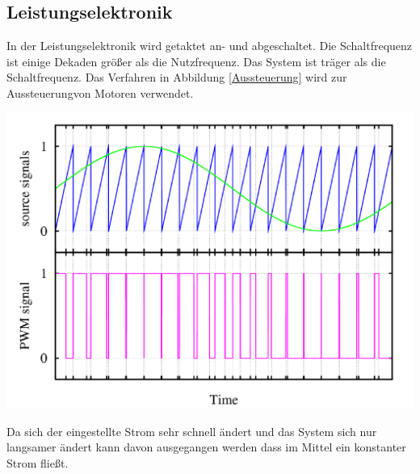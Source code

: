 \documentclass[10pt,a4paper,oneside,abstracton]{scrartcl}
\newenvironment{Figure}
  {\par\medskip\noindent\minipage{\linewidth}}
  {\endminipage\par\medskip}
\begin{document}
\begin{multicols}{2}
\subsection{Leistungselektronik}
In der Leistungselektronik wird getaktet an- und abgeschaltet. 
Die Schaltfrequenz ist einige Dekaden größer als die Nutzfrequenz. 
Das System ist träger als die Schaltfrequenz.
Das Verfahren in Abbildung \ref*{Aussteuerung} wird zur Aussteuerungvon Motoren verwendet.
\begin{Figure}
	\includegraphics[width=\textwidth]{Bilder/BLDC_Aussteuerung.png}
	\label{Aussteuerung}
\end{Figure}
\noindent
Da sich der eingestellte Strom sehr schnell ändert und das System sich nur langsamer ändert 
kann davon ausgegangen werden dass im Mittel ein konstanter Strom fließt. 



\end{multicols}
\end{document}
